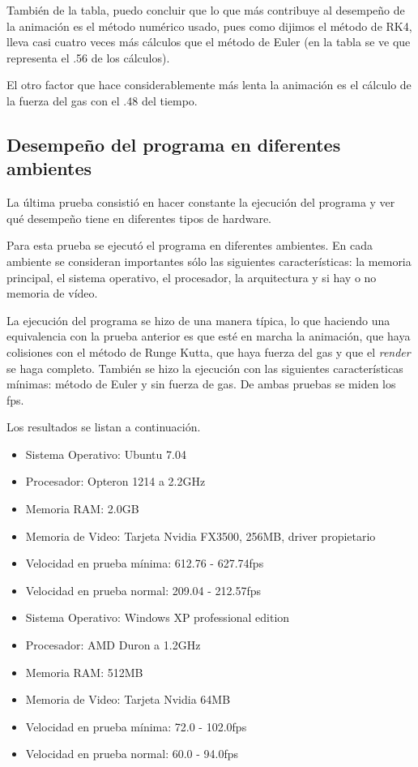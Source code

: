También de la tabla, puedo concluir  que lo que más contribuye al desempeño de la animación es el método numérico usado, pues como dijimos el
método de RK4, lleva casi cuatro veces más cálculos que el método de Euler (en la tabla se ve que representa el .56 de los cálculos).

El otro factor que hace considerablemente más lenta la animación es el cálculo de la fuerza del gas con el .48 del tiempo.

\subsection{Desempeño del programa en diferentes ambientes}

La última prueba consistió en hacer constante la ejecución del programa y ver qué desempeño tiene en diferentes tipos de hardware.

Para esta  prueba se ejecutó el programa en diferentes ambientes.
En cada ambiente se consideran importantes sólo las siguientes características: la memoria principal, el sistema operativo, el procesador, la arquitectura y si hay o no memoria de vídeo.

La ejecución del programa se hizo de una manera típica, lo que haciendo una equivalencia con la prueba anterior es que esté en marcha la animación, que haya colisiones con el método de Runge Kutta, que haya fuerza del gas y que el \emph{\foreignlanguage{english}{render}} se haga completo.
También se hizo la ejecución con las siguientes características mínimas: método de Euler y sin fuerza de gas.
De ambas pruebas se miden los fps.

Los resultados se listan a continuación.
\begin{itemize}
 \item Sistema Operativo: Ubuntu 7.04
 \item Procesador: Opteron 1214 a 2.2GHz
 \item Memoria RAM: 2.0GB
 \item Memoria de Video: Tarjeta Nvidia FX3500, 256MB, driver propietario
 \item Velocidad en prueba mínima: 612.76 - 627.74fps
 \item Velocidad en prueba normal: 209.04 - 212.57fps
\end{itemize}

\begin{itemize}
 \item Sistema Operativo: Windows XP professional edition
 \item Procesador: AMD Duron a 1.2GHz
 \item Memoria RAM: 512MB
 \item Memoria de Video: Tarjeta Nvidia 64MB
 \item Velocidad en prueba mínima: 72.0 - 102.0fps
 \item Velocidad en prueba normal: 60.0 - 94.0fps
\end{itemize}

